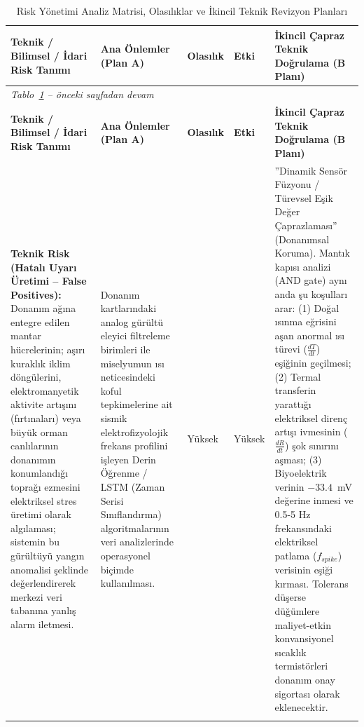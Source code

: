 \documentclass[11pt,a4paper]{article}
\begin{document}
\begin{longtable}{p{3.4cm}p{3.6cm}p{1.4cm}p{1.4cm}p{4.7cm}}
\caption{Risk Yönetimi Analiz Matrisi, Olasılıklar ve İkincil Teknik Revizyon Planları}\label{tab:riskmatrisi}\\
\toprule
\textbf{Teknik / Bilimsel / İdari Risk Tanımı} & \textbf{Ana Önlemler (Plan A)} & \textbf{Olasılık} & \textbf{Etki} & \textbf{İkincil Çapraz Teknik Doğrulama (B Planı)}\\
\midrule
\endfirsthead
\multicolumn{5}{l}{\textit{Tablo~\ref{tab:riskmatrisi} -- önceki sayfadan devam}}\\
\toprule
\textbf{Teknik / Bilimsel / İdari Risk Tanımı} & \textbf{Ana Önlemler (Plan A)} & \textbf{Olasılık} & \textbf{Etki} & \textbf{İkincil Çapraz Teknik Doğrulama (B Planı)}\\
\midrule
\endhead
\textbf{Teknik Risk (Hatalı Uyarı Üretimi -- False Positives):} Donanım ağına entegre edilen mantar hücrelerinin; aşırı kuraklık iklim döngülerini, elektromanyetik aktivite artışını (fırtınaları) veya büyük orman canlılarının donanımın konumlandığı toprağı ezmesini elektriksel stres üretimi olarak algılaması; sistemin bu gürültüyü yangın anomalisi şeklinde değerlendirerek merkezi veri tabanına yanlış alarm iletmesi. & Donanım kartlarındaki analog gürültü eleyici filtreleme birimleri ile miselyumun ısı neticesindeki koful tepkimelerine ait sismik elektrofizyolojik frekans profilini işleyen Derin Öğrenme / LSTM (Zaman Serisi Sınıflandırma) algoritmalarının veri analizlerinde operasyonel biçimde kullanılması. & Yüksek & Yüksek & ''Dinamik Sensör Füzyonu / Türevsel Eşik Değer Çaprazlaması'' (Donanımsal Koruma). Mantık kapısı analizi (AND gate) aynı anda şu koşulları arar: (1) Doğal ısınma eğrisini aşan anormal ısı türevi ($\frac{dT}{dt}$) eşiğinin geçilmesi; (2) Termal transferin yarattığı elektriksel direnç artışı ivmesinin ($\frac{dR}{dt}$) şok sınırını aşması; (3) Biyoelektrik verinin $-33.4$~mV değerine inmesi ve 0.5-5 Hz frekansındaki elektriksel patlama ($f_{spike}$) verisinin eşiği kırması. Tolerans düşerse düğümlere maliyet-etkin konvansiyonel sıcaklık termistörleri donanım onay sigortası olarak eklenecektir.\\
\addlinespace

\end{longtable}
\end{document}
